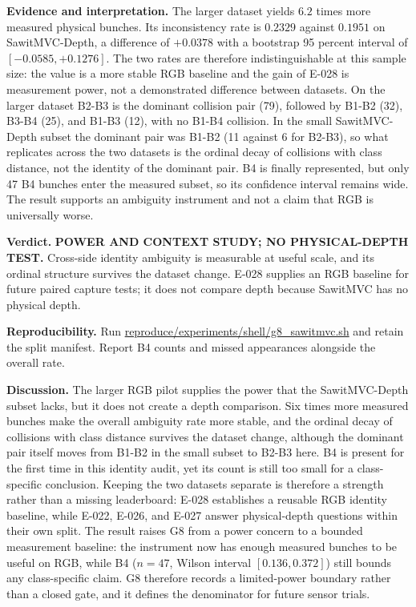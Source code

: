 \documentclass[preprint,12pt]{elsarticle}
\newcommand{\pathcode}[1]{\scriptsize\url{#1}}
\begin{document}
\textbf{Evidence and interpretation.} The larger dataset yields \(6.2\)
times more measured physical bunches. Its inconsistency rate is \(0.2329\)
against \(0.1951\) on SawitMVC-Depth, a difference of \(+0.0378\) with a
bootstrap 95 percent interval of \([-0.0585,+0.1276]\). The two rates are
therefore indistinguishable at this sample size: the value is a more stable
RGB baseline and the gain of E-028 is measurement power, not a demonstrated
difference between datasets. On the larger dataset B2-B3 is the dominant
collision pair (79), followed by B1-B2 (32), B3-B4 (25), and B1-B3 (12), with
no B1-B4 collision. In the small SawitMVC-Depth subset the dominant pair was
B1-B2 (11 against 6 for B2-B3), so what replicates across the two datasets is
the ordinal decay of collisions with class distance, not the identity of the
dominant pair. B4 is finally
represented, but only 47 B4 bunches enter the measured subset, so its
confidence interval remains wide. The result supports an ambiguity instrument
and not a claim that RGB is universally worse.

\textbf{Verdict.} \textbf{POWER AND CONTEXT STUDY; NO PHYSICAL-DEPTH TEST.}
Cross-side identity ambiguity is measurable at useful scale, and its ordinal
structure survives the dataset change. E-028 supplies an RGB baseline for
future paired capture tests; it does not compare depth because SawitMVC has no
physical depth.

\textbf{Reproducibility.} Run \pathcode{reproduce/experiments/shell/g8_sawitmvc.sh} and retain the
split manifest. Report B4 counts and missed appearances alongside the overall
rate.

\textbf{Discussion.} The larger RGB pilot supplies the power that the
SawitMVC-Depth subset lacks, but it does not create a depth comparison. Six
times more measured bunches make the overall ambiguity rate more stable, and
the ordinal decay of collisions with class distance survives the dataset
change, although the dominant pair itself moves from B1-B2 in the small subset
to B2-B3 here. B4 is present for the
first time in this identity audit, yet its count is still too small for a
class-specific conclusion. Keeping the two datasets separate is therefore a
strength rather than a missing leaderboard: E-028 establishes a reusable RGB
identity baseline, while E-022, E-026, and E-027 answer physical-depth
questions within their own split. The result raises G8 from a power concern to
a bounded measurement baseline: the instrument now has enough measured bunches
to be useful on RGB, while B4 (\(n=47\), Wilson interval \([0.136, 0.372]\))
still bounds any class-specific claim. G8 therefore records a limited-power
boundary rather than a closed gate, and it defines the denominator for future
sensor trials.
\end{document}
